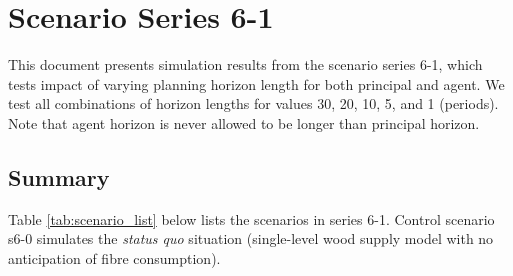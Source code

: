 \chapter{Scenario Series 6-1}

This document presents simulation results from the scenario series 6-1, which tests impact of varying planning horizon length for both principal and agent. 
We test all combinations of horizon lengths for values 30, 20, 10, 5,  and 1 (periods). 
Note that agent horizon is never allowed to be longer than principal horizon.

\section{Summary}
Table \ref{tab:scenario_list} below lists the scenarios in series 6-1. 
Control scenario s6-0 simulates the \emph{status quo} situation (single-level wood supply model with no anticipation of fibre consumption).  

